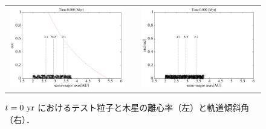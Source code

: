 \documentclass[11pt,a4paper,oneside,onecolumn]{jreport}
\begin{document}
\begin{figure}[H]
\begin{tabular}{ccc}
\begin{minipage}[t]{0.45\hsize}
\centering
\includegraphics[width=8cm]{./image/asteroid_ecc_0yr.pdf}
\end{minipage} &
\begin{minipage}[t]{0.1\hsize}
\end{minipage} &
\begin{minipage}[t]{0.45\hsize}
\centering
\includegraphics[width=8cm]{./image/asteroid_inc_0yr.pdf}
\end{minipage}\\
%
\end{tabular}
\caption{$t = 0\ {\rm yr}$ におけるテスト粒子と木星の離心率（左）と軌道傾斜角（右）．\label{fig:asteroid_ecc_inc_0yr}}
\end{figure}
\end{document}
